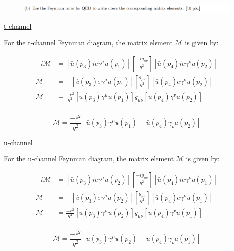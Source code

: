 \documentclass[11pt]{article}
\theoremstyle{definition}
\numberwithin{equation}{section}
\begin{document}
\newpage



\begin{figure}[H]
    \centering
    \includegraphics[scale = 0.4]{2b.png}
\end{figure}

\underline{t-channel}

For the t-channel Feynman diagram, the matrix element $\mathcal{M}$ is given by:

\begin{align}
    -i\mathcal{M} &= [\bar{u}(p_3)ie\gamma^{\mu}u(p_1)] 
    \left[ \frac{-ig_{\mu\nu}}{q^2} \right]
    [\bar{u}(p_4)ie\gamma^{\nu}u(p_2)]\\
    \mathcal{M} &= -[\bar{u}(p_3)e\gamma^{\mu}u(p_1)] 
    \left[ \frac{g_{\mu\nu}}{q^2} \right]
    [\bar{u}(p_4)e\gamma^{\nu}u(p_2)]\\
    \mathcal{M} &= \frac{-e^2}{q^2} [\bar{u}(p_3)\gamma^{\mu}u(p_1)]
    g_{\mu\nu}[\bar{u}(p_4)\gamma^{\nu}u(p_2)]\\
\end{align}

\begin{equation}
\boxed{
    \mathcal{M}= \frac{-e^2}{q^2} [\bar{u}(p_3)\gamma^{\mu}u(p_1)]
    [\bar{u}(p_4)\gamma_{\nu}u(p_2)]
}
\end{equation}

\underline{u-channel}

For the u-channel Feynman diagram, the matrix element $\mathcal{M}$ is given by:

\begin{align}
    -i\mathcal{M} &= [\bar{u}(p_3)ie\gamma^{\mu}u(p_2)] 
    \left[ \frac{-ig_{\mu\nu}}{q^2} \right]
    [\bar{u}(p_4)ie\gamma^{\nu}u(p_1)]\\
    \mathcal{M} &= -[\bar{u}(p_3)e\gamma^{\mu}u(p_2)] 
    \left[ \frac{g_{\mu\nu}}{q^2} \right]
    [\bar{u}(p_4)e\gamma^{\nu}u(p_1)]\\
    \mathcal{M} &= \frac{-e^2}{q^2} [\bar{u}(p_3)\gamma^{\mu}u(p_2)]
    g_{\mu\nu}[\bar{u}(p_4)\gamma^{\nu}u(p_1)]\\
\end{align}

\begin{equation}
\boxed{
    \mathcal{M}= \frac{-e^2}{q^2} [\bar{u}(p_3)\gamma^{\mu}u(p_2)]
    [\bar{u}(p_4)\gamma_{\nu}u(p_1)]
}
\end{equation}
\newpage
\end{document}
